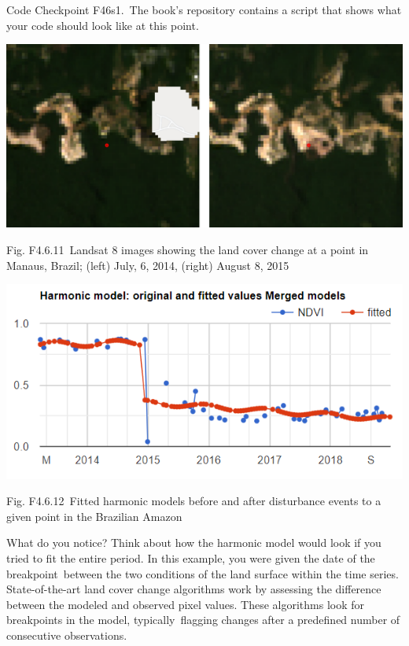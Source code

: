 \documentclass[
  letterpaper,
  DIV=11,
  numbers=noendperiod]{scrreprt}
\begin{document}
\begin{tcolorbox}[enhanced jigsaw, left=2mm, breakable, rightrule=.15mm, opacityback=0, colframe=quarto-callout-note-color-frame, colbacktitle=quarto-callout-note-color!10!white, arc=.35mm, opacitybacktitle=0.6, toptitle=1mm, colback=white, leftrule=.75mm, title=\textcolor{quarto-callout-note-color}{\faInfo}\hspace{0.5em}{Note}, toprule=.15mm, bottomtitle=1mm, titlerule=0mm, bottomrule=.15mm, coltitle=black]

Code Checkpoint F46s1.~The book's repository contains a script that
shows what your code should look like at this point.

\end{tcolorbox}

\includegraphics{./F4/image26.png}

Fig. F4.6.11~Landsat 8 images showing the land cover change at a point
in Manaus, Brazil; (left) July, 6, 2014, (right) August 8, 2015

\includegraphics{./F4/image36.png}

Fig. F4.6.12~Fitted harmonic models before and after disturbance events
to a given point in the Brazilian Amazon

What do you notice? Think about how the harmonic model would look if you
tried to fit the entire period. In this example, you were given the date
of the breakpoint~between the two conditions of the land surface within
the time series. State-of-the-art land cover change algorithms work by
assessing the difference between the modeled and observed pixel values.
These algorithms look for breakpoints in the model, typically~flagging
changes after a predefined number of consecutive observations.
\end{document}
